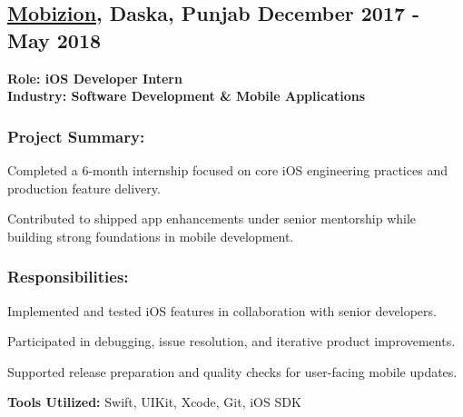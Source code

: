 \subsection{\textbf{\href{https://www.mobizion.com/}{Mobizion}, Daska, Punjab} \hfill December 2017 - May 2018}
\noindent\textbf{Role: iOS Developer Intern}\\
\noindent\textbf{Industry: Software Development \& Mobile Applications}

\subsubsection*{\textbf{Project Summary:}}
\begin{zitemize}
\item Completed a 6-month internship focused on core iOS engineering practices and production feature delivery.
\item Contributed to shipped app enhancements under senior mentorship while building strong foundations in mobile development.
\end{zitemize}

\subsubsection*{\textbf{Responsibilities:}}
\begin{zitemize}
\item Implemented and tested iOS features in collaboration with senior developers.
\item Participated in debugging, issue resolution, and iterative product improvements.
\item Supported release preparation and quality checks for user-facing mobile updates.
\end{zitemize}

\noindent\textbf{Tools Utilized:} Swift, UIKit, Xcode, Git, iOS SDK